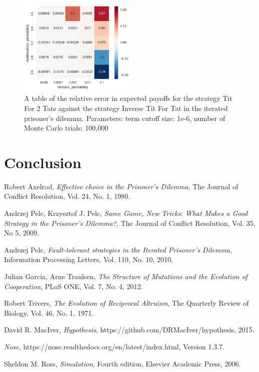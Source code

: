 \documentclass[a4paper,12pt]{article}
\begin{document}
\begin{figure}
    \caption{A table of the relative error in expected payoffs for the strategy Tit For 2 Tats against the strategy Inverse Tit For Tat in the iterated prisoner's dilemma. Parameters: term cutoff size: 1e-6, number of Monte Carlo trials: 100,000}
    \label{error_table}
    \centering
        \includegraphics[width=0.5\textwidth]{error_table}
\end{figure}

\section{Conclusion}

\begin{thebibliography}{9}

        Robert Axelrod,
        \emph{Effective choice in the Prisoner's Dilemma},
        The Journal of Conflict Resolution,
        Vol. 24,
        No. 1,
        1980.

        Andrzej Pelc, Krzysztof J. Pelc,
        \emph{Same Game, New Tricks: What Makes a Good Strategy in the Prisoner's Dilemma?},
        The Journal of Conflict Resolution,
        Vol. 35,
        No 5,
        2009.

        Andrzej Pelc,
        \emph{Fault-tolerant strategies in the Iterated Prisoner's Dilemma},
        Information Processing Letters,
        Vol. 110,
        No. 10,
        2010.

        Julian Garcia, Arne Traulsen,
        \emph{The Structure of Mutations and the Evolution of Cooperation},
        PLoS ONE,
        Vol. 7,
        No. 4,
        2012.

        Robert Trivers,
        \emph{The Evolution of Reciprocal Altruism},
        The Quarterly Review of Biology,
        Vol. 46,
        No. 1,
        1971.

        David R. MacIver,
        \emph{Hypothesis},
        https://github.com/DRMacIver/hypothesis,
        2015.

        \emph{Nose},
        https://nose.readthedocs.org/en/latest/index.html,
        Version 1.3.7.

        Sheldon M. Ross,
        \emph{Simulation},
        Fourth edition,
        Elsevier Academic Press,
        2006.

\end{thebibliography}
\end{document}

